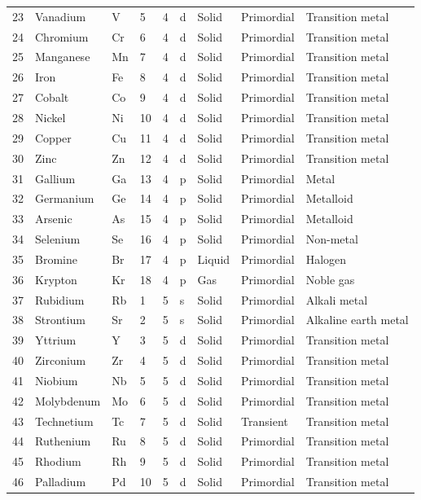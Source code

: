 \documentclass{article}
\begin{document}
\begin{tabular}{lllllllll}
23 & Vanadium & V & 5 & 4 & d & Solid & Primordial & Transition metal \\
24 & Chromium & Cr & 6 & 4 & d & Solid & Primordial & Transition metal \\
25 & Manganese & Mn & 7 & 4 & d & Solid & Primordial & Transition metal \\
26 & Iron & Fe & 8 & 4 & d & Solid & Primordial & Transition metal \\
27 & Cobalt & Co & 9 & 4 & d & Solid & Primordial & Transition metal \\
28 & Nickel & Ni & 10 & 4 & d & Solid & Primordial & Transition metal \\
29 & Copper & Cu & 11 & 4 & d & Solid & Primordial & Transition metal \\
30 & Zinc & Zn & 12 & 4 & d & Solid & Primordial & Transition metal \\
31 & Gallium & Ga & 13 & 4 & p & Solid & Primordial & Metal \\
32 & Germanium & Ge & 14 & 4 & p & Solid & Primordial & Metalloid \\
33 & Arsenic & As & 15 & 4 & p & Solid & Primordial & Metalloid \\
34 & Selenium & Se & 16 & 4 & p & Solid & Primordial & Non-metal \\
35 & Bromine & Br & 17 & 4 & p & Liquid & Primordial & Halogen \\
36 & Krypton & Kr & 18 & 4 & p & Gas & Primordial & Noble gas \\
37 & Rubidium & Rb & 1 & 5 & s & Solid & Primordial & Alkali metal \\
38 & Strontium & Sr & 2 & 5 & s & Solid & Primordial & Alkaline earth metal \\
39 & Yttrium & Y & 3 & 5 & d & Solid & Primordial & Transition metal \\
40 & Zirconium & Zr & 4 & 5 & d & Solid & Primordial & Transition metal \\
41 & Niobium & Nb & 5 & 5 & d & Solid & Primordial & Transition metal \\
42 & Molybdenum & Mo & 6 & 5 & d & Solid & Primordial & Transition metal \\
43 & Technetium & Tc & 7 & 5 & d & Solid & Transient & Transition metal \\
44 & Ruthenium & Ru & 8 & 5 & d & Solid & Primordial & Transition metal \\
45 & Rhodium & Rh & 9 & 5 & d & Solid & Primordial & Transition metal \\
46 & Palladium & Pd & 10 & 5 & d & Solid & Primordial & Transition metal \\

\end{tabular}
\end{document}
